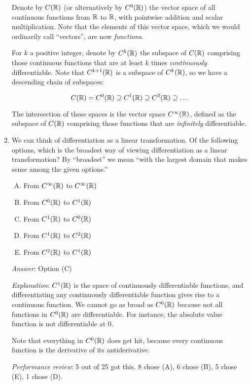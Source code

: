 \documentclass[10pt]{amsart}
\begin{document}
\begin{enumerate}
  Denote by $C(\mathbb{R})$ (or alternatively by $C^0(\mathbb{R})$) the vector space
  of all continuous functions from $\mathbb{R}$ to $\mathbb{R}$, with pointwise
  addition and scalar multiplication. Note that the elements of this
  vector space, which we would ordinarily call ``vectors'', are now
  {\em functions}.

  For $k$ a positive integer, denote by $C^k(\mathbb{R})$ the subspace of
  $C(\mathbb{R})$ comprising those continuous functions that are at least $k$
  times {\em continuously} differentiable. Note that $C^{k+1}(\mathbb{R})$ is
  a subspace of $C^k(\mathbb{R})$, so we have a descending chain of subspaces:

  $$C(\mathbb{R}) = C^0(\mathbb{R}) \supseteq C^1(\mathbb{R}) \supseteq C^2(\mathbb{R}) \supseteq \dots $$

  The intersection of these spaces is the vector space $C^\infty(\mathbb{R})$,
  defined as the subspace of $C(\mathbb{R})$ comprising those functions that
  are {\em infinitely} differentiable.

\item We can think of differentiation as a linear transformation. Of
  the following options, which is the broadest way of viewing
  differentiation as a linear transformation? By ``broadest'' we mean
  ``with the largest domain that makes sense among the given options.''

  \begin{enumerate}[(A)]
  \item From $C^\infty(\mathbb{R})$ to $C^\infty(\mathbb{R})$
  \item From $C^0(\mathbb{R})$ to $C^1(\mathbb{R})$
  \item From $C^1(\mathbb{R})$ to $C^0(\mathbb{R})$
  \item From $C^1(\mathbb{R})$ to $C^2(\mathbb{R})$
  \item From $C^2(\mathbb{R})$ to $C^1(\mathbb{R})$
  \end{enumerate}

  {\em Answer}: Option (C)

  {\em Explanation}: $C^1(\mathbb{R})$ is the space of continuously
  differentiable functions, and differentiating any continuously
  differentiable function gives rise to a continuous function. We
  cannot go as broad as $C^0(\mathbb{R})$ because not all functions in
  $C^0(\mathbb{R})$ are differentiable. For instance, the absolute value
  function is not differentiable at $0$.

  Note that everything in $C^0(\mathbb{R})$ does get hit, because every
  continuous function is the derivative of its antiderivative.

  {\em Performance review}: 5 out of 25 got this. 8 chose (A), 6 chose
  (B), 5 chose (E), 1 chose (D).


\end{enumerate}
\end{document}
